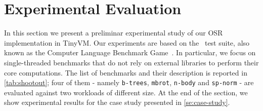
\section{Experimental Evaluation}
\label{se:experiments}

In this section we present a preliminar experimental study of our OSR implementation in TinyVM. Our experiments are based on the \shootout\ test suite, also known as the Computer Language Benchmark Game~\cite{shootout}. In particular, we focus on single-threaded benchmarks that do not rely on external libraries to perform their core computations.
The list of benchmarks and their description is reported in \mytable\ref{tab:shootout}; four of them - namely {\tt b-trees}, {\tt mbrot}, {\tt n-body} and {\tt sp-norm} - are evaluated against two workloads of different size.
At the end of the section, we show experimental results for the case study presented in \mysection\ref{se:case-study}.

